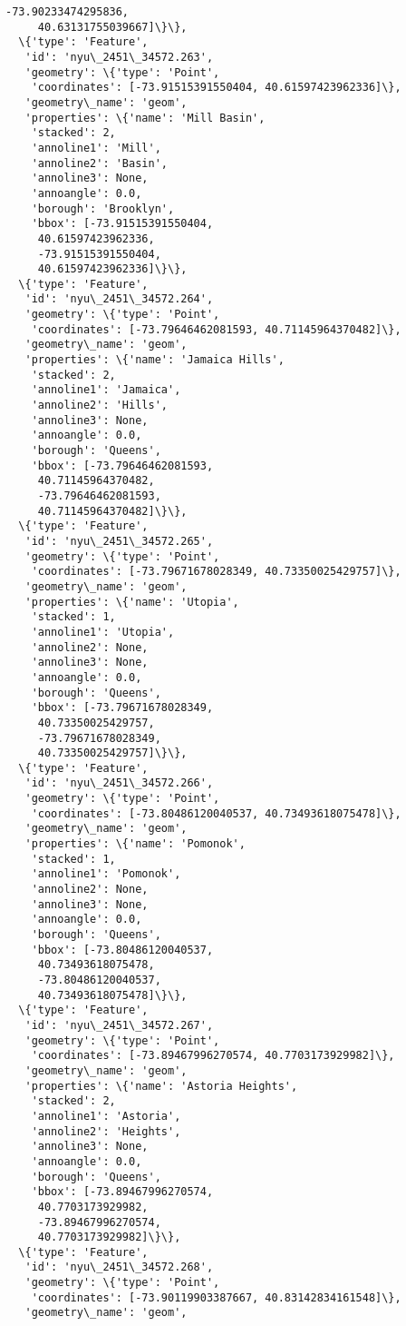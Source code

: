 \documentclass[11pt]{article}
\begin{document}
\begin{tcolorbox}[breakable, size=fbox, boxrule=.5pt, pad at break*=1mm, opacityfill=0]
\begin{Verbatim}[commandchars=\\\{\}]
     -73.90233474295836,
     40.63131755039667]\}\},
  \{'type': 'Feature',
   'id': 'nyu\_2451\_34572.263',
   'geometry': \{'type': 'Point',
    'coordinates': [-73.91515391550404, 40.61597423962336]\},
   'geometry\_name': 'geom',
   'properties': \{'name': 'Mill Basin',
    'stacked': 2,
    'annoline1': 'Mill',
    'annoline2': 'Basin',
    'annoline3': None,
    'annoangle': 0.0,
    'borough': 'Brooklyn',
    'bbox': [-73.91515391550404,
     40.61597423962336,
     -73.91515391550404,
     40.61597423962336]\}\},
  \{'type': 'Feature',
   'id': 'nyu\_2451\_34572.264',
   'geometry': \{'type': 'Point',
    'coordinates': [-73.79646462081593, 40.71145964370482]\},
   'geometry\_name': 'geom',
   'properties': \{'name': 'Jamaica Hills',
    'stacked': 2,
    'annoline1': 'Jamaica',
    'annoline2': 'Hills',
    'annoline3': None,
    'annoangle': 0.0,
    'borough': 'Queens',
    'bbox': [-73.79646462081593,
     40.71145964370482,
     -73.79646462081593,
     40.71145964370482]\}\},
  \{'type': 'Feature',
   'id': 'nyu\_2451\_34572.265',
   'geometry': \{'type': 'Point',
    'coordinates': [-73.79671678028349, 40.73350025429757]\},
   'geometry\_name': 'geom',
   'properties': \{'name': 'Utopia',
    'stacked': 1,
    'annoline1': 'Utopia',
    'annoline2': None,
    'annoline3': None,
    'annoangle': 0.0,
    'borough': 'Queens',
    'bbox': [-73.79671678028349,
     40.73350025429757,
     -73.79671678028349,
     40.73350025429757]\}\},
  \{'type': 'Feature',
   'id': 'nyu\_2451\_34572.266',
   'geometry': \{'type': 'Point',
    'coordinates': [-73.80486120040537, 40.73493618075478]\},
   'geometry\_name': 'geom',
   'properties': \{'name': 'Pomonok',
    'stacked': 1,
    'annoline1': 'Pomonok',
    'annoline2': None,
    'annoline3': None,
    'annoangle': 0.0,
    'borough': 'Queens',
    'bbox': [-73.80486120040537,
     40.73493618075478,
     -73.80486120040537,
     40.73493618075478]\}\},
  \{'type': 'Feature',
   'id': 'nyu\_2451\_34572.267',
   'geometry': \{'type': 'Point',
    'coordinates': [-73.89467996270574, 40.7703173929982]\},
   'geometry\_name': 'geom',
   'properties': \{'name': 'Astoria Heights',
    'stacked': 2,
    'annoline1': 'Astoria',
    'annoline2': 'Heights',
    'annoline3': None,
    'annoangle': 0.0,
    'borough': 'Queens',
    'bbox': [-73.89467996270574,
     40.7703173929982,
     -73.89467996270574,
     40.7703173929982]\}\},
  \{'type': 'Feature',
   'id': 'nyu\_2451\_34572.268',
   'geometry': \{'type': 'Point',
    'coordinates': [-73.90119903387667, 40.83142834161548]\},
   'geometry\_name': 'geom',

\end{Verbatim}
\end{tcolorbox}
\end{document}

